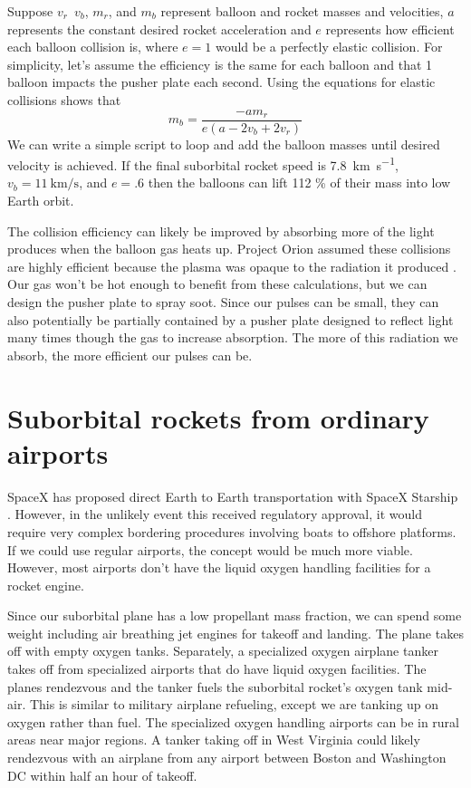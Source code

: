 \documentclass{article}
\begin{document}
Suppose \(v_r\)\,  \(v_b\),  \(m_r\), and \(m_b\) represent balloon and rocket masses and velocities,    \(a\) represents the constant desired rocket acceleration and \(e\) represents how efficient each balloon collision is, where \(e=1\) would be a perfectly elastic collision.   For simplicity, let's assume the efficiency is the same for each balloon and that 1 balloon impacts the pusher plate each second.   Using the equations for elastic collisions shows that 
\begin{equation}
m_b=\frac{-am_r}{e(a - 2v_b + 2v_r)}
\label{eq:balloon_mass}
\end{equation}
We can write a simple script to loop and add the balloon masses until desired velocity is achieved.   If the final suborbital rocket speed is \SI{7.8}{\kilo\metre\per\second}, \(v_b=\SI{11}{\kilo\metre\per\second}\), and \(e=.6\) then the balloons can lift 112 \% of their mass into low Earth orbit.   

The collision efficiency can likely be improved by absorbing more of the light produces when the balloon gas heats up.   Project Orion assumed these collisions are highly efficient because the plasma was opaque to the radiation it produced \cite{orion_reflections}.  Our gas won't be hot enough to benefit from these calculations, but we can design the pusher plate to spray soot.   Since our pulses can be small, they can also potentially be partially contained by a pusher plate designed to reflect light many times though the gas to increase absorption.   The more of this radiation we absorb, the more efficient our pulses can be.  

\section{Suborbital rockets from ordinary airports}\label{sec:suborbital_airports}
SpaceX has proposed direct Earth to Earth transportation with SpaceX Starship \cite{spacex_earth_earth}.   However, in the unlikely event this received regulatory approval, it would require very complex bordering procedures involving boats to offshore platforms.   If we could use regular airports, the concept would be much more viable.    However, most airports don't have the liquid oxygen handling facilities for a rocket engine.

Since our suborbital plane has a low propellant mass fraction, we can spend some weight including air breathing jet engines for takeoff and landing.   The plane takes off with empty oxygen tanks.   Separately, a specialized oxygen airplane tanker takes off from specialized airports that do have liquid oxygen facilities.    The planes rendezvous and the tanker fuels the suborbital rocket's oxygen tank mid-air.   This is similar to military airplane refueling, except we are tanking up on oxygen rather than fuel.   The specialized oxygen handling airports can be in rural areas near major regions.   A tanker taking off in West Virginia could likely rendezvous with an airplane from any airport between Boston and Washington DC within half an hour of takeoff.   
\end{document}

